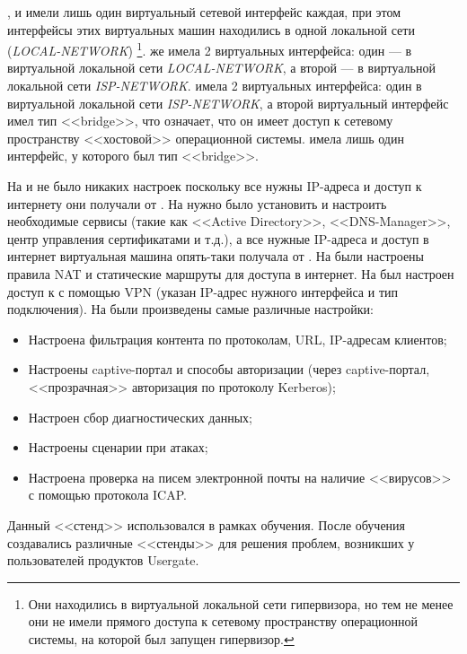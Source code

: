 \begin{justify}
		\CLIA{}, \CLIB{} и \DC{} имели лишь один виртуальный сетевой интерфейс каждая, при этом интерфейсы этих виртуальных машин находились в одной локальной сети (\textit{LOCAL-NETWORK}) \footnote{Они находились в виртуальной локальной сети гипервизора, но тем не менее они не имели прямого доступа к сетевому пространству операционной системы, на которой был запущен гипервизор.}. \UTM{} же имела 2 виртуальных интерфейса: один --- в виртуальной локальной сети \textit{LOCAL-NETWORK}, а второй --- в виртуальной локальной сети \textit{ISP-NETWORK}. \ISP{} имела 2 виртуальных интерфейса: один в виртуальной локальной сети \textit{ISP-NETWORK}, а второй виртуальный интерфейс имел тип <<bridge>>, что означает, что он имеет доступ к сетевому пространству <<хостовой>> операционной системы. \CLIEXT{} имела лишь один интерфейс, у которого был тип <<bridge>>.
			
		На \CLIA{} и \CLIB{} не было никаких настроек поскольку все нужны IP-адреса и доступ к интернету они получали от \UTM{}. На \DC{} нужно было установить и настроить необходимые сервисы (такие как <<Active Directory>>, <<DNS-Manager>>, центр управления сертификатами и т.д.), а все нужные IP-адреса и доступ в интернет виртуальная машина опять-таки получала от \UTM{}. На \ISP{} были настроены правила NAT и статические маршруты для доступа в интернет. На \CLIEXT{} был настроен доступ к \UTM{} с помощью VPN (указан IP-адрес нужного интерфейса \UTM{} и тип подключения). На \UTM{} были произведены самые различные настройки:
		
		\begin{itemize}
			\item Настроена фильтрация контента по протоколам, URL, IP-адресам клиентов;
			
			\item Настроены captive-портал и способы авторизации (через captive-портал, <<прозрачная>> авторизация по протоколу Kerberos);
			
			\item Настроен сбор диагностических данных;
			
			\item Настроены сценарии при атаках;
			
			\item Настроена проверка на писем электронной почты на наличие <<вирусов>> с помощью протокола ICAP.
		\end{itemize}
		
		Данный <<стенд>> использовался в рамках обучения. После обучения создавались различные <<стенды>> для решения проблем, возникших у пользователей продуктов Usergate.
	\end{justify}
